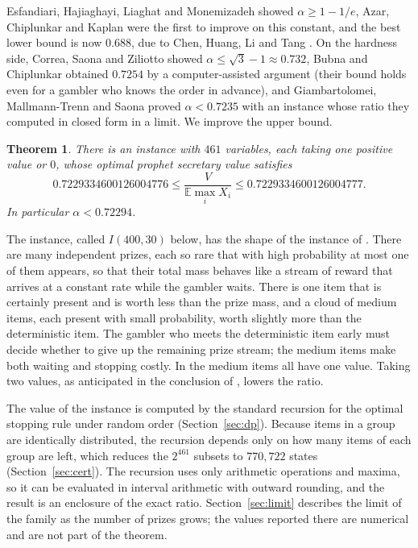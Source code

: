 \documentclass[11pt]{amsart}
\newtheorem{theorem}{Theorem}[section]
\theoremstyle{remark}\newtheorem{remark}[theorem]{Remark}
\newcommand{\E}{\mathbb{E}}
\begin{document}
Esfandiari, Hajiaghayi, Liaghat and Monemizadeh \cite{ehlm} showed $\alpha\ge 1-1/e$, Azar, Chiplunkar and Kaplan \cite{ack} were the first to improve on this constant, and the best lower bound is now
$0.688$, due to Chen, Huang, Li and Tang \cite{chlt}. On the hardness side, Correa, Saona and Ziliotto \cite{csz} showed
$\alpha\le\sqrt3-1\approx0.732$, Bubna and Chiplunkar \cite{bc} obtained $0.7254$ by a computer-assisted argument (their
bound holds even for a gambler who knows the order in advance), and Giambartolomei, Mallmann-Trenn and Saona \cite{gms}
proved $\alpha<0.7235$ with an instance whose ratio they computed in closed form in a limit. We improve the upper bound.

\begin{theorem}\label{thm:main}
There is an instance with $461$ variables, each taking one positive value or $0$, whose optimal prophet secretary value
satisfies
\[
0.7229334600126004776\le\frac{V}{\E\max_i X_i}\le0.7229334600126004777 .
\]
In particular $\alpha<0.72294$.
\end{theorem}

The instance, called $I(400,30)$ below, has the shape of the instance of \cite{gms}. There are many independent prizes,
each so rare that with high probability at most one of them appears, so that their total mass behaves like a stream of
reward that arrives at a constant rate while the gambler waits. There is one item that is certainly present and is worth
less than the prize mass, and a cloud of medium items, each present with small probability, worth slightly more than the
deterministic item. The gambler who meets the deterministic item early must decide whether to give up the remaining
prize stream; the medium items make both waiting and stopping costly. In \cite{gms} the medium items all have one value.
Taking two values, as anticipated in the conclusion of \cite{gms}, lowers the ratio.

The value of the instance is computed by the standard recursion for the optimal stopping rule under random order
(Section~\ref{sec:dp}). Because items in a group are identically distributed, the recursion depends only on how many items
of each group are left, which reduces the $2^{461}$ subsets to $770{,}722$ states (Section~\ref{sec:cert}). The
recursion uses only arithmetic operations and maxima, so it can be evaluated in interval
arithmetic with outward rounding, and the result is an enclosure of the exact ratio. Section~\ref{sec:limit} describes
the limit of the family as the number of prizes grows; the values reported there are numerical and are not part of the
theorem.
\end{document}
